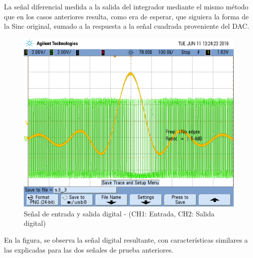 \documentclass[assd_tp3_main.tex]{subfiles}
\begin{document}
La señal diferencial medida a la salida del integrador mediante el mismo método que en los casos anteriores resulta, como era de esperar, que siguiera la forma de la Sinc original, sumado a la respuesta a la señal cuadrada proveniente del DAC.


\begin{figure}[!ht]
\begin{centering}
\includegraphics[scale=0.25]{../EJ4/Mediciones/Sinc/s3_3.png}
\par\end{centering}
\caption{Señal de entrada y salida digital - (CH1: Entrada, CH2: Salida digital)}
\end{figure}

En la figura, se observa la señal digital resultante, con características similares a las explicadas para las dos señales de prueba anteriores.

\newpage
\end{document}
